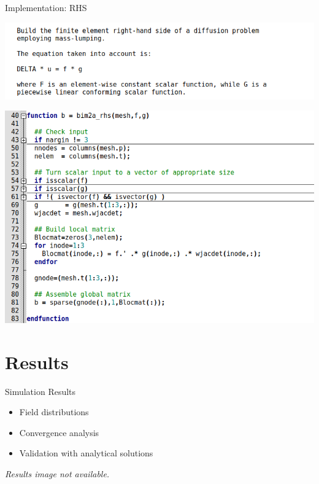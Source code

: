 \documentclass[aspectratio=54,xcolor=dvipsnames]{beamer}
\begin{document}
\begin{frame}{Implementation: RHS}
    \begin{center}
        \begin{minipage}{0.60\textwidth}
            \centering
            \includegraphics[width=\textwidth]{Images/bim_rhs_help.png}
        \end{minipage}\hfill
        \begin{minipage}{0.78\textwidth}
            \centering
            \includegraphics[width=\textwidth]{Images/bim_rhs.png}
        \end{minipage}
    \end{center}
\end{frame}

\section{Results}
\begin{frame}{Simulation Results}
    \begin{itemize}
        \item Field distributions
        \item Convergence analysis
        \item Validation with analytical solutions
    \end{itemize}
    \begin{center}
        \textit{Results image not available.}
    \end{center}
\end{frame}
\end{document}
